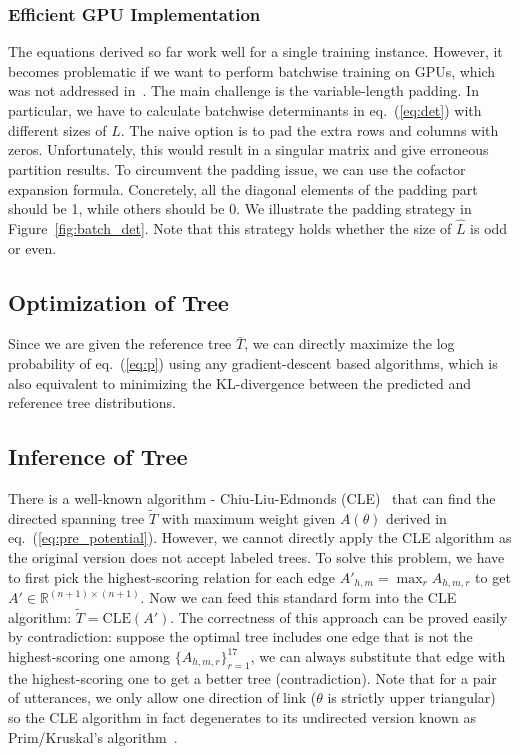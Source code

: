 \documentclass[11pt]{article}
\begin{document}
\subsubsection{Efficient GPU Implementation}
The equations derived so far work well for a single training instance. However, it becomes problematic if we want to perform batchwise training on GPUs, which was not addressed in~\citet{koo2007structured}.
The main challenge is the variable-length padding. In particular, we have to calculate batchwise determinants in eq.~(\ref{eq:det}) with different sizes of $\hat L$. The naive option is to pad the extra rows and columns with zeros. Unfortunately, this would result in a singular matrix and give erroneous partition results. To circumvent the padding issue, we can use the cofactor expansion formula. Concretely, all the diagonal elements of the padding part should be 1, while others should be 0. We illustrate the padding strategy in Figure~\ref{fig:batch_det}. Note that this strategy holds whether the size of $\hat L$ is odd or even.

\subsection{Optimization of Tree}
Since we are given the reference tree $\bar T$, we can directly maximize the log probability of eq.~(\ref{eq:p}) using any gradient-descent based algorithms, which is also equivalent to minimizing the KL-divergence between the predicted and reference tree distributions.


\subsection{Inference of Tree}
\label{sec:inference}
There is a well-known algorithm - Chiu-Liu-Edmonds (CLE)~\cite{edmonds1967optimum,chu1965shortest} that can find the directed spanning tree $\tilde T$ with maximum weight given $A(\theta)$ derived in eq.~(\ref{eq:pre_potential}). However, we cannot directly apply the CLE algorithm as the original version does not accept labeled trees. To solve this problem, we have to first pick the highest-scoring relation for each edge $A'_{h,m}=\max_r A_{h,m,r}$ to get $A'\in \mathbb{R}^{(n+1)\times (n+1)}$. Now we can feed this standard form into the CLE algorithm: $\tilde T = \mathrm{CLE}(A')$. The correctness of this approach can be proved easily by contradiction: suppose the optimal tree includes one edge that is not the highest-scoring one among $\{A_{h,m,r}\}_{r=1}^{17}$, we can always substitute that edge with the highest-scoring one to get a better tree (contradiction). Note that for a pair of utterances, we only allow one direction of link ($\theta$ is strictly upper triangular) so the CLE algorithm in fact degenerates to its undirected version known as Prim/Kruskal's algorithm~\cite{prim1957shortest,kruskal1956shortest}.
\end{document}

